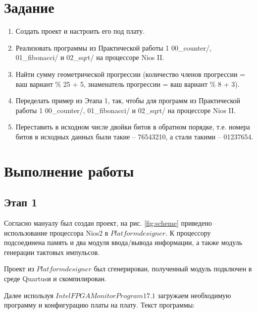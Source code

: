 \documentclass[a4paper,14pt]{article}
\begin{document}
	
	\tableofcontents
	\pagebreak
	\section{Задание}
	
	\begin{enumerate}
		\item Создать проект и настроить его под плату.
		
		\item Реализовать программы из Практической работы 1 00\_counter/, 01\_fibonacci/ и 02\_sqrt/ на процессоре Nios II.
		
		\item Найти сумму геометрической прогрессии (количество членов прогрессии = ваш вариант \% 25 + 5, знаменатель прогрессии = ваш вариант \% 8 + 3).
		
		\item Переделать пример из Этапа 1, так, чтобы для программ из Практической работы 1 00\_counter/, 01\_fibonacci/ и 02\_sqrt/ на процессоре Nios II.
		
		\item Переставить в исходном числе двойки битов в обратном порядке, т.е. номера битов в исходных данных были такие – 76543210, а стали такими – 01237654.
		
	\end{enumerate}

	
	\section{Выполнение работы}
	
	\subsection{Этап 1}
	
	Согласно мануалу был создан проект, на рис. \ref{fig:scheme} приведено использование процессора Nios2 в $Platform designer$.
	К процессору подсоединена память и два модуля ввода/вывода информации, а также модуль генерации тактовых импульсов.
	
	Проект из $Platform designer$ был сгенерирован, полученный модуль подключен в среде Quartusи и скомпилирован.
	
	Далее используя $Intel FPGA Monitor Program 17.1$ загружаем необходимую программу и конфигурацию платы на плату.
	Текст программы:
	
\end{document}
